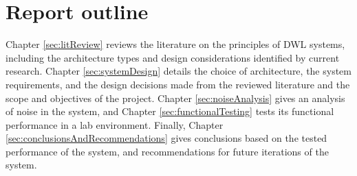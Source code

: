 \section{Report outline}

Chapter \ref{sec:litReview} reviews the literature on the principles of DWL systems, including the architecture types and design considerations identified by current research. Chapter \ref{sec:systemDesign} details the choice of architecture, the system requirements, and the design decisions made from the reviewed literature and the scope and objectives of the project. Chapter \ref{sec:noiseAnalysis} gives an analysis of noise in the system, and Chapter \ref{sec:functionalTesting} tests its functional performance in a lab environment. Finally, Chapter \ref{sec:conclusionsAndRecommendations} gives conclusions based on the tested performance of the system, and recommendations for future iterations of the system.

